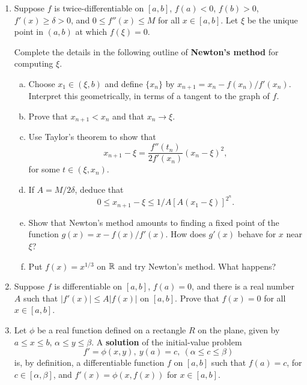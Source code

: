\begin{enumerate}[1.]
    \begin{proof}
        Consider the derivatives of $f$ and $g$ at their fixed point.
    \end{proof}
\item %
    Suppose $f$ is twice-differentiable on $[a, b]$, $f(a) < 0$, $f(b) > 0$, $f'(x) \ge \delta > 0$, and $0 \le f''(x) \le M$ for all $x \in [a, b]$. Let $\xi$ be the unique point in $(a, b)$ at which $f(\xi) = 0$.

    Complete the details in the following outline of \textbf{Newton's method} for computing $\xi$.
    \begin{enumerate}[(a)]
        \item Choose $x_1 \in (\xi, b)$ and define $\{x_n\}$ by $x_{n+1} = x_n - f(x_n) / f'(x_n)$. Interpret this geometrically, in terms of a tangent to the graph of $f$.
        \item Prove that $x_{n+1} < x_n$ and that $x_n \to \xi$.
        \item Use Taylor's theorem to show that
            \[
                x_{n+1} - \xi = \frac{f''(t_n)}{2f'(x_n)} (x_n - \xi)^2,
            \]
            for some $t \in (\xi, x_n)$.
        \item If $A = M/2\delta$, deduce that
            \[
                0 \le x_{n+1} - \xi \le 1/A [A(x_1 - \xi)]^{2^n}.
            \]
        \item Show that Newton's method amounts to finding a fixed point of the function $g(x) = x - f(x)/f'(x)$. How does $g'(x)$ behave for $x$ near $\xi$?
        \item Put $f(x) = x^{1/3}$ on $\mathbb{R}$ and try Newton's method. What happens?
    \end{enumerate}
\item %
    Suppose $f$ is differentiable on $[a, b]$, $f(a) = 0$, and there is a real number $A$ such that $|f'(x)| \le A|f(x)|$ on $[a, b]$. Prove that $f(x) = 0$ for all $x \in [a, b]$. 
\item %
    Let $\phi$ be a real function defined on a rectangle $R$ on the plane, given by $a \le x \le b$, $\alpha \le y \le \beta$. A \textbf{solution} of the initial-value problem
    \[
        f' = \phi(x, y),\ y(a) = c,\ (\alpha \le c \le \beta)
    \]
    is, by definition, a differentiable function $f$ on $[a, b]$ such that $f(a) = c$, for $c \in [\alpha, \beta]$, and $f'(x) = \phi(x, f(x))$ for $x \in [a, b]$.


\end{enumerate}
